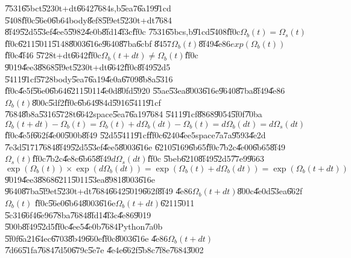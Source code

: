 \documentclass[12pt,a4paper]{article}
\begin{document}
\U{7531}\U{65bc}t\U{5230}t+dt\U{6642}\U{7684}s,b\U{5ea7}\U{6a19}\U{91cd}%
\U{5408}\U{ff0c}\U{56e0}\U{6b64}body\U{8ef8}\U{5f9e}t\U{5230}t+dt\U{7684}%
\U{8f49}\U{52d5}\U{53ef}\U{4ee5}\U{5982}\U{4e0b}\U{8fd1}\U{4f3c}\U{ff0c}%
\U{7531}\U{65bc}s,b\U{91cd}\U{5408}\U{ff0c}$\Omega _{b}(t)=\Omega _{s}(t)$%
\U{ff0c}\U{6211}\U{5011}\U{5148}\U{8003}\U{616e}\U{9640}\U{87ba}\U{6cbf}%
\U{8457}$\Omega _{b}(t)$\U{8f49}\U{4e86}$exp(\Omega _{b}(t))$\U{ff0c}\U{4f46}%
\U{5728}t+dt\U{6642}\U{ff0c}$\Omega _{b}(t+dt)\neq \Omega _{b}(t)$\U{ff0c}%
\U{9019}\U{4ee3}\U{8868}\U{5f9e}t\U{5230}t+dt\U{6642}\U{ff0c}\U{8f49}\U{52d5}%
\U{5411}\U{91cf}\U{5728}body\U{5ea7}\U{6a19}\U{4e0a}\U{6709}\U{8b8a}\U{5316}%
\U{ff0c}\U{4e5f}\U{56e0}\U{6b64}\U{6211}\U{5011}\U{4e0d}\U{80fd}\U{5920}%
\U{55ae}\U{53ea}\U{8003}\U{616e}\U{9640}\U{87ba}\U{8f49}\U{4e86}$\Omega
_{b}(t)$\U{800c}\U{5df2}\U{ff0c}\U{6b64}\U{984d}\U{5916}\U{5411}\U{91cf}%
\U{7684}\U{8b8a}\U{5316}\U{5728}t\U{6642}space\U{5ea7}\U{6a19}\U{7684}%
\U{5411}\U{91cf}\U{8868}\U{9054}\U{5f0f}\U{70ba}$\Omega _{b}(t+dt)-\Omega
_{b}(t)=\Omega _{b}(t)+d\Omega _{b}(dt)-\Omega _{b}(t)=d\Omega
_{b}(dt)=d\Omega _{s}(dt)$\U{ff0c}\U{4e5f}\U{662f}\U{4e00}\U{500b}\U{8f49}%
\U{52d5}\U{5411}\U{91cf}\U{ff0c}\U{6240}\U{4ee5}space\U{7a7a}\U{9593}\U{4e2d}%
\U{7e3d}\U{5171}\U{7684}\U{8f49}\U{52d5}\U{53ef}\U{4ee5}\U{8003}\U{616e}%
\U{6210}\U{5169}\U{6b65}\U{ff0c}\U{7b2c}\U{4e00}\U{6b65}\U{8f49}$\Omega
_{s}(t)$\U{ff0c}\U{7b2c}\U{4e8c}\U{6b65}\U{8f49}$d\Omega _{s}(dt)$\U{ff0c}%
\U{5beb}\U{6210}\U{8f49}\U{52d5}\U{77e9}\U{9663}%
\begin{equation}
\exp (\Omega _{b}(t))\times \exp (d\Omega _{b}(dt))=\exp (\Omega
_{b}(t)+d\Omega _{b}(dt))=\exp (\Omega _{b}(t+dt))
\end{equation}%
\U{9019}\U{4ee3}\U{8868}\U{6211}\U{5011}\U{53ea}\U{8981}\U{8003}\U{616e}%
\U{9640}\U{87ba}\U{5f9e}t\U{5230}t+dt\U{7684}\U{6642}\U{5019}\U{662f}\U{8f49}%
\U{4e86}$\Omega _{b}(t+dt)$\U{800c}\U{4e0d}\U{53ea}\U{662f}$\Omega _{b}(t)$%
\U{ff0c}\U{56e0}\U{6b64}\U{8003}\U{616e}$\Omega _{b}(t+dt)$\U{6211}\U{5011}%
\U{5c31}\U{66f4}\U{6e96}\U{78ba}\U{7684}\U{8fd1}\U{4f3c}\U{4e86}\U{9019}%
\U{500b}\U{8f49}\U{52d5}\U{ff0c}\U{4ee5}\U{4e0b}\U{7684}Python\U{7a0b}%
\U{5f0f}\U{6a21}\U{64ec}\U{6703}\U{8b49}\U{660e}\U{ff0c}\U{8003}\U{616e}%
\U{4e86}$\Omega _{b}(t+dt)$\U{7d66}\U{51fa}\U{7684}\U{7d50}\U{679c}\U{5e7e}%
\U{4e4e}\U{662f}\U{5b8c}\U{7f8e}\U{7684}\U{3002}
\end{document}
